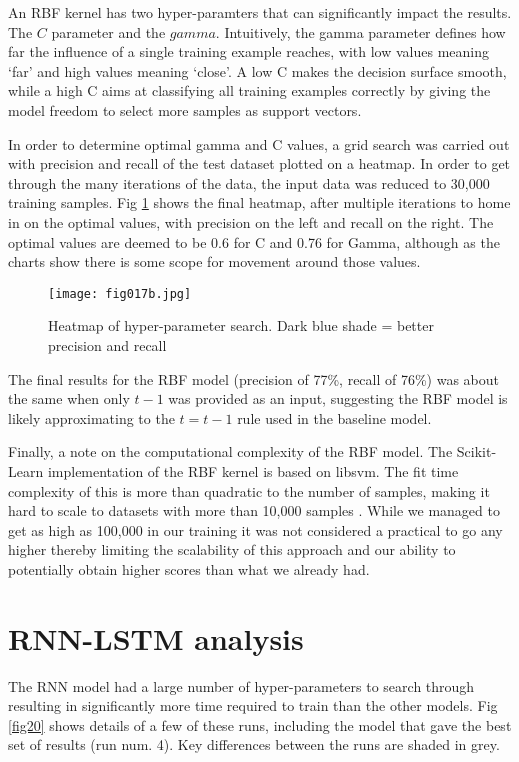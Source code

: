 An RBF kernel has two hyper-paramters that can significantly impact the results. The $C$ parameter and the $gamma$. Intuitively, the gamma parameter defines how far the influence of a single training example reaches, with low values meaning ‘far’ and high values meaning ‘close’. A low C makes the decision surface smooth, while a high C aims at classifying all training examples correctly by giving the model freedom to select more samples as support vectors.

In order to determine optimal gamma and C values, a grid search was carried out with precision and recall of the test dataset plotted on a heatmap. In order to get through the many iterations of the data, the input data was reduced to 30,000 training samples. Fig \ref{fig17b} shows the final heatmap, after multiple iterations to home in on the optimal values, with precision on the left and recall on the right. The optimal values are deemed to be 0.6 for C and 0.76 for Gamma, although as the charts show there is some scope for movement around those values.

\begin{figure}[h!]
	\centering
	\texttt{[image: fig017b.jpg]}
	\caption{Heatmap of hyper-parameter search. Dark blue shade = better precision and recall}
	\label{fig17b}
\end{figure} 

The final results for the RBF model (precision of 77\%, recall of 76\%) was about the same when only $t-1$ was provided as an input, suggesting the RBF model is likely approximating to the $t=t-1$ rule used in the baseline model.

Finally, a note on the computational complexity of the RBF model. The Scikit-Learn implementation of the RBF kernel is based on libsvm. The fit time complexity of this is more than quadratic to the number of samples, making it hard to scale to datasets with more than 10,000 samples \parencite{chang2011libsvm}.
While we managed to get as high as 100,000 in our training it was not considered a practical to go any higher thereby limiting the scalability of this approach and our ability to potentially obtain higher scores than what we already had.

\newpage

\section{RNN-LSTM analysis}

The RNN model had a large number of hyper-parameters to search through resulting in significantly more time required to train than the other models. Fig \ref{fig20} shows details of a few of these runs, including the model that gave the best set of results (run num. 4). Key differences between the runs are shaded in grey.

